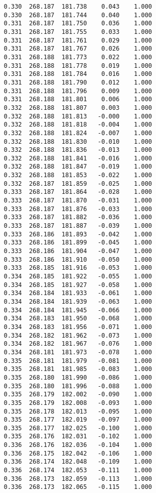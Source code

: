 \begin{verbatim}
   0.330  268.187  181.738    0.043    1.000
   0.330  268.187  181.744    0.040    1.000
   0.331  268.187  181.750    0.036    1.000
   0.331  268.187  181.755    0.033    1.000
   0.331  268.187  181.761    0.029    1.000
   0.331  268.187  181.767    0.026    1.000
   0.331  268.188  181.773    0.022    1.000
   0.331  268.188  181.778    0.019    1.000
   0.331  268.188  181.784    0.016    1.000
   0.331  268.188  181.790    0.012    1.000
   0.331  268.188  181.796    0.009    1.000
   0.331  268.188  181.801    0.006    1.000
   0.332  268.188  181.807    0.003    1.000
   0.332  268.188  181.813   -0.000    1.000
   0.332  268.188  181.818   -0.004    1.000
   0.332  268.188  181.824   -0.007    1.000
   0.332  268.188  181.830   -0.010    1.000
   0.332  268.188  181.836   -0.013    1.000
   0.332  268.188  181.841   -0.016    1.000
   0.332  268.188  181.847   -0.019    1.000
   0.332  268.188  181.853   -0.022    1.000
   0.332  268.187  181.859   -0.025    1.000
   0.333  268.187  181.864   -0.028    1.000
   0.333  268.187  181.870   -0.031    1.000
   0.333  268.187  181.876   -0.033    1.000
   0.333  268.187  181.882   -0.036    1.000
   0.333  268.187  181.887   -0.039    1.000
   0.333  268.186  181.893   -0.042    1.000
   0.333  268.186  181.899   -0.045    1.000
   0.333  268.186  181.904   -0.047    1.000
   0.333  268.186  181.910   -0.050    1.000
   0.333  268.185  181.916   -0.053    1.000
   0.334  268.185  181.922   -0.055    1.000
   0.334  268.185  181.927   -0.058    1.000
   0.334  268.184  181.933   -0.061    1.000
   0.334  268.184  181.939   -0.063    1.000
   0.334  268.184  181.945   -0.066    1.000
   0.334  268.183  181.950   -0.068    1.000
   0.334  268.183  181.956   -0.071    1.000
   0.334  268.182  181.962   -0.073    1.000
   0.334  268.182  181.967   -0.076    1.000
   0.334  268.181  181.973   -0.078    1.000
   0.335  268.181  181.979   -0.081    1.000
   0.335  268.181  181.985   -0.083    1.000
   0.335  268.180  181.990   -0.086    1.000
   0.335  268.180  181.996   -0.088    1.000
   0.335  268.179  182.002   -0.090    1.000
   0.335  268.179  182.008   -0.093    1.000
   0.335  268.178  182.013   -0.095    1.000
   0.335  268.177  182.019   -0.097    1.000
   0.335  268.177  182.025   -0.100    1.000
   0.335  268.176  182.031   -0.102    1.000
   0.336  268.176  182.036   -0.104    1.000
   0.336  268.175  182.042   -0.106    1.000
   0.336  268.174  182.048   -0.109    1.000
   0.336  268.174  182.053   -0.111    1.000
   0.336  268.173  182.059   -0.113    1.000
   0.336  268.173  182.065   -0.115    1.000

\end{verbatim}
